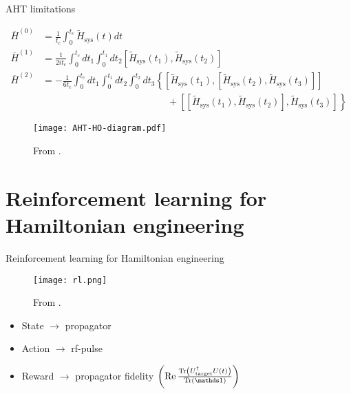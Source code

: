 \documentclass{beamer}
\begin{document}
\begin{frame}{AHT limitations}

{\scriptsize %
\begin{align*}
    \overline{H}^{(0)} &= \frac{1}{t_c} \int_0^{t_c}
        \widetilde{H}_{\text{sys}}(t) dt \\
    \overline{H}^{(1)} &= \frac{1}{2it_c} \int_0^{t_c} dt_1 \int_0^{t_1} dt_2
        \left[\widetilde{H}_{\text{sys}}(t_1), \widetilde{H}_{\text{sys}}(t_2)\right] \\
    \overline{H}^{(2)} &= -\frac{1}{6t_c}
    \int_0^{t_c} dt_1 \int_0^{t_1} dt_2 \int_0^{t_2} dt_3
    \left\{
    \left[\widetilde{H}_{\text{sys}}(t_1), \left[\widetilde{H}_{\text{sys}}(t_2), \widetilde{H}_{\text{sys}}(t_3)\right]\right] \right. \\
    & \hspace{13em} + \left.
    \left[\left[\widetilde{H}_{\text{sys}}(t_1), \widetilde{H}_{\text{sys}}(t_2)\right], \widetilde{H}_{\text{sys}}(t_3)\right]
    \right\}
\end{align*}
}
\vspace{-1em}
\begin{figure}
\centering
\texttt{[image: AHT-HO-diagram.pdf]}

{\scriptsize From \cite{brinkmann_2016}.}
\end{figure}


\end{frame}



\section{Reinforcement learning for Hamiltonian engineering}

\begin{frame}{Reinforcement learning for Hamiltonian engineering}

\begin{figure}
\centering
\texttt{[image: rl.png]}

From \cite{sutton2018reinforcement}.
\end{figure}

\begin{itemize}
    \item State $\to$ propagator
    \item Action $\to$ rf-pulse
    \item Reward $\to$ propagator fidelity $\left(\Re{
        \frac{\Tr{U_\text{target}^\dagger U(t)}}{\Tr{\identity}}
    }\right)$
\end{itemize}

\end{frame}
\end{document}

